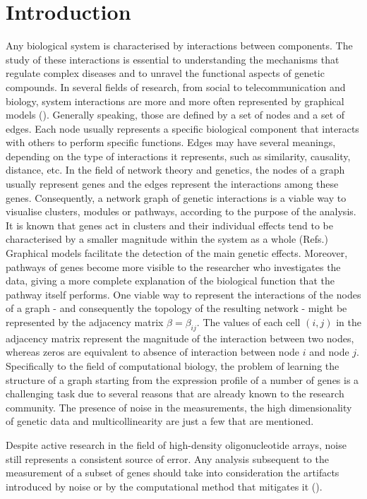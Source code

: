 \section{Introduction}
Any biological system is characterised by interactions between components. The study of these interactions is essential to understanding the mechanisms that regulate complex diseases and to unravel the functional aspects of genetic compounds. 
In several fields of research, from social to telecommunication and biology, system interactions are more and more often represented by graphical models (\citealp{Vidal2011Complex, BAR03a, wisdomcrowds}). Generally speaking, those are defined by a set of nodes and a set of edges. Each node usually represents a specific biological component that interacts with others to perform specific functions. Edges may have several meanings, depending on the type of interactions it represents, such as similarity, causality, distance, etc. 
In the field of network theory and genetics, the nodes of a graph usually represent genes and the edges represent the interactions among these genes. Consequently, a network graph of genetic interactions is a viable way to visualise clusters, modules or pathways, according to the purpose of the analysis.
It is known that genes act in clusters and their individual effects tend to be characterised by a smaller magnitude within the system as a whole (Refs.) Graphical models facilitate the detection of the main genetic effects. Moreover, pathways of genes become more visible to the researcher who investigates the data, giving a more complete explanation of the biological function that the pathway itself performs.
One viable way to represent the interactions of the nodes of a graph - and consequently the  topology of the resulting network - might be represented by the adjacency matrix $\beta = \beta_{ij}$. The values of each cell $(i,j)$ in the adjacency matrix represent the magnitude of the interaction between two nodes, whereas zeros are equivalent to absence of interaction between node $i$ and node $j$. 
Specifically to the field of computational biology, the problem of learning the structure of a graph starting from the expression profile of a number of genes is a challenging task due to several reasons that are already known to the research community. The presence of noise in the measurements, the high dimensionality of genetic data and multicollinearity are just a few that are mentioned.
 
Despite active research in the field of high-density oligonucleotide arrays, noise still represents a consistent source of error. Any analysis subsequent to the measurement of a subset of genes should take into consideration the artifacts introduced by noise or by the computational method that mitigates it (\citealp{microarray_noise, microarray_high_noise}).
   
